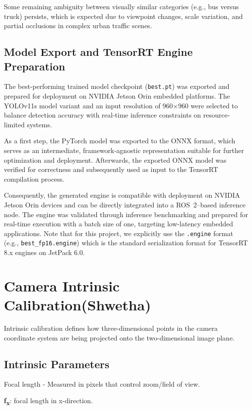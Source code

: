 \documentclass[12pt,a4paper]{report}
\begin{document}
Some remaining ambiguity between visually similar categories (e.g., bus versus truck) persists, which is expected due to viewpoint changes, scale variation, and partial occlusions in complex urban traffic scenes.

 

\subsection{Model Export and TensorRT Engine Preparation}

The best-performing trained model checkpoint (\texttt{best.pt}) was exported and prepared for deployment on NVIDIA Jetson Orin embedded platforms. The YOLOv11s model variant and an input resolution of 960×960 were selected to balance detection accuracy with real-time inference constraints on resource-limited systems.

As a first step, the PyTorch model was exported to the ONNX format, which serves as an intermediate, framework-agnostic representation suitable for further optimization and deployment. Afterwards, the exported ONNX model was verified for correctness and subsequently used as input to the TensorRT compilation process.

Consequently, the generated engine is compatible with deployment on NVIDIA Jetson Orin devices and can be directly integrated into a ROS~2–based inference node. The engine was validated through inference benchmarking and prepared for real-time execution with a batch size of one, targeting low-latency embedded applications. Note that for this project, we explicitly use the \texttt{.engine} format (e.g., \texttt{best\_fp16.engine}) which is the standard serialization format for TensorRT 8.x engines on JetPack 6.0.

\section{Camera Intrinsic Calibration(Shwetha)}
Intrinsic calibration defines how three-dimensional points in the camera coordinate system are being projected onto the two-dimensional image plane. 

\subsection{Intrinsic Parameters}
Focal length - Measured in pixels that control zoom/field of view.

\textbf{f\textsubscript{x}}: focal length in x-direction.
\end{document}
